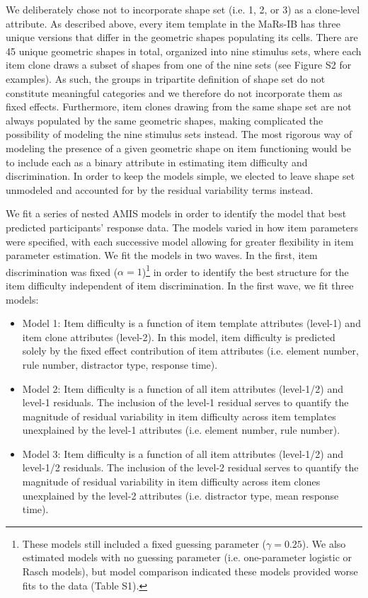 \documentclass[a4paper,man,natbib]{apa6}
\begin{document}
We deliberately chose not to incorporate shape set (i.e. 1, 2, or 3) as a clone-level attribute. As described above, every item template in the MaRs-IB has three unique versions that differ in the geometric shapes populating its cells. There are 45 unique geometric shapes in total, organized into nine stimulus sets, where each item clone draws a subset of shapes from one of the nine sets (see Figure S2 for examples). As such, the groups in tripartite definition of shape set do not constitute meaningful categories and we therefore do not incorporate them as fixed effects. Furthermore, item clones drawing from the same shape set are not always populated by the same geometric shapes, making complicated the possibility of modeling the nine stimulus sets instead. The most rigorous way of modeling the presence of a given geometric shape on item functioning would be to include each as a binary attribute in estimating item difficulty and discrimination. In order to keep the models simple, we elected to leave shape set unmodeled and accounted for by the residual variability terms instead. 

We fit a series of nested AMIS models in order to identify the model that best predicted participants' response data. The models varied in how item parameters were specified, with each successive model allowing for greater flexibility in item parameter estimation. We fit the models in two waves. In the first, item discrimination was fixed ($\alpha = 1$)\footnote{These models still included a fixed guessing parameter ($\gamma = 0.25$). We also estimated models with no guessing parameter (i.e. one-parameter logistic or Rasch models), but model comparison indicated these models provided worse fits to the data (Table S1).} in order to identify the best structure for the item difficulty independent of item discrimination. In the first wave, we fit three models:

\begin{itemize}

\item Model 1: Item difficulty is a function of item template attributes (level-1) and item clone attributes (level-2). In this model, item difficulty is predicted solely by the fixed effect contribution of item attributes (i.e. element number, rule number, distractor type, response time). 

\item Model 2: Item difficulty is a function of all item attributes (level-1/2) and level-1 residuals. The inclusion of the level-1 residual serves to quantify the magnitude of residual variability in item difficulty across item templates unexplained by the level-1 attributes (i.e. element number, rule number).

\item Model 3: Item difficulty is a function of all item attributes (level-1/2) and level-1/2 residuals. The inclusion of the level-2 residual serves to quantify the magnitude of residual variability in item difficulty across item clones unexplained by the level-2 attributes (i.e. distractor type, mean response time).

\end{itemize}
\end{document}
